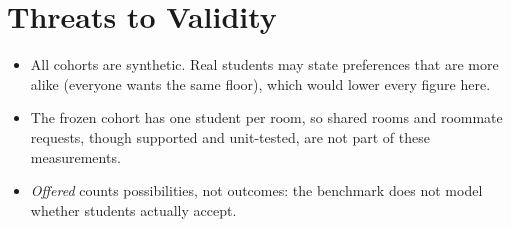 \section{Threats to Validity}

\begin{itemize}
  \item All cohorts are synthetic. Real students may state preferences
  that are more alike (everyone wants the same floor), which would lower
  every figure here.
  \item The frozen cohort has one student per room, so shared rooms and
  roommate requests, though supported and unit-tested, are not part of
  these measurements.
  \item \emph{Offered} counts possibilities, not outcomes: the benchmark
  does not model whether students actually accept.
\end{itemize}
